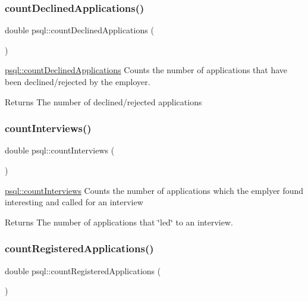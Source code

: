 \subsubsection{\texorpdfstring{count\+Declined\+Applications()}{countDeclinedApplications()}}
{\footnotesize\ttfamily double psql\+::count\+Declined\+Applications (\begin{DoxyParamCaption}{ }\end{DoxyParamCaption})}



\mbox{\hyperlink{classpsql_a40541367c3af9c0ac94e2fb92f00f53c}{psql\+::count\+Declined\+Applications}} Counts the number of applications that have been declined/rejected by the employer. 

\begin{DoxyReturn}{Returns}
The number of declined/rejected applications 
\end{DoxyReturn}
\mbox{\label{classpsql_a84c1fdea2d09783a39677c4f79d924fc}} 
\subsubsection{\texorpdfstring{count\+Interviews()}{countInterviews()}}
{\footnotesize\ttfamily double psql\+::count\+Interviews (\begin{DoxyParamCaption}{ }\end{DoxyParamCaption})}



\mbox{\hyperlink{classpsql_a84c1fdea2d09783a39677c4f79d924fc}{psql\+::count\+Interviews}} Counts the number of applications which the emplyer found interesting and called for an interview 

\begin{DoxyReturn}{Returns}
The number of applications that \char`\"{}led\char`\"{} to an interview. 
\end{DoxyReturn}
\mbox{\label{classpsql_a8673a80968d293cd3ead6e6e9da8dd8a}} 
\subsubsection{\texorpdfstring{count\+Registered\+Applications()}{countRegisteredApplications()}}
{\footnotesize\ttfamily double psql\+::count\+Registered\+Applications (\begin{DoxyParamCaption}{ }\end{DoxyParamCaption})}



